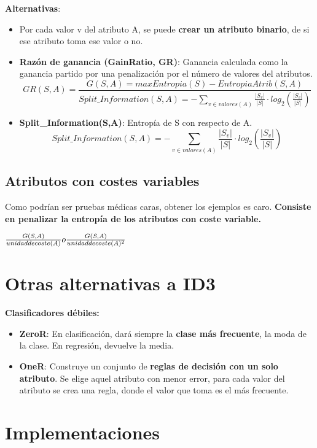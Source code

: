 \documentclass[12pt]{report} %
\begin{document}
\textbf{Alternativas}:

\begin{itemize}

\item
  Por cada valor v del atributo A, se puede \textbf{crear un atributo binario},
  de si ese atributo toma ese valor o no.
\item
  \textbf{Razón de ganancia (GainRatio, GR)}: Ganancia calculada como la
  ganancia partido por una penalización por el número de valores del
  atributos.
  $$
  GR(S,A)= \frac {G(S,A)=max Entropia(S)-EntropiaAtrib(S,A)}{Split\_Information(S,A)=-\sum_{v\in valores(A)} \frac {|S_v|}{|S|} \cdot log_2(\frac {|S_v|}{|S|})}
  $$
\item
  \textbf{Split\_Information(S,A)}: Entropía de S con respecto de A.
  $$
  Split\_Information(S,A)=-\sum_{v\in valores(A)} \frac {|S_v|}{|S|} \cdot log_2(\frac {|S_v|}{|S|}) 
  $$
\end{itemize}

\subsection{Atributos con costes
variables}

Como podrían ser pruebas médicas caras, obtener los ejemplos es caro.
\textbf{Consiste en penalizar la entropía de los atributos con coste
variable.}

\(\frac {G(S,A)}{unidad \space de \space coste(A)} o \frac {G(S,A)}{unidad \space de \space coste(A)^2}\)

\section{Otras alternativas a ID3}

\textbf{Clasificadores débiles:}

\begin{itemize}

\item
  \textbf{ZeroR}: En clasificación, dará siempre la \textbf{clase más
  frecuente}, la moda de la clase. En regresión, devuelve la media.
\item
  \textbf{OneR}: Construye un conjunto de \textbf{reglas de decisión con
  un solo atributo}. Se elige aquel atributo con menor error, para cada
  valor del atributo se crea una regla, donde el valor que toma es el
  más frecuente.
\end{itemize}

\section{Implementaciones}
\end{document}
